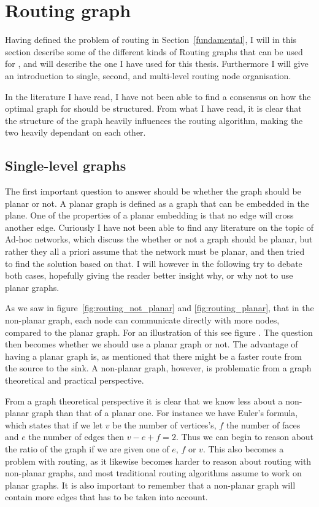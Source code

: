 \section{Routing graph}
Having defined the problem of routing in Section~\ref{fundamental}, I will in this section describe some of the different kinds of Routing graphs that can be used for \manet, and will describe the one I have used for this thesis. Furthermore I will give an introduction to single, second, and multi-level routing node organisation. 

In the literature I have read, I have not been able to find a consensus on how the optimal graph for \manet should be structured. From what I have read, it is clear that the structure of the graph heavily influences the routing algorithm, making the two heavily dependant on each other.

\subsection{Single-level graphs}
\label{single_level}
The first important question to answer should be whether the graph should be planar or not. A planar graph is defined as a graph that can be embedded in the plane. One of the properties of a planar embedding is that no edge will cross another edge.
Curiously I have not been able to find any literature on the topic of Ad-hoc networks, which discuss the whether or not a graph should be planar, but rather they all a priori assume that the network must be planar, and then tried to find the solution based on that. I will however in the following try to debate both cases, hopefully giving the reader better insight why, or why not to use planar graphs.

 As we saw in figure~\ref{fig:routing_not_planar} and \ref{fig:routing_planar}, that in the non-planar graph, each node can communicate directly with more nodes, compared to the planar graph. For an illustration of this see figure . The question then becomes whether we should use a planar graph or not. The advantage of having a planar graph is, as mentioned that there might be a faster route from the source to the sink. A non-planar graph, however, is problematic from a graph theoretical and practical perspective.

From a graph theoretical perspective it is clear that we know less about a non-planar graph than that of a planar one. For instance we have Euler's formula, which states that if we let $v$ be the number of vertices's, $f$ the number of faces and $e$ the number of edges then $v - e + f = 2$. Thus we can begin to reason about the ratio of the graph if we are given one of $e$, $f$ or $v$. This also becomes a problem with routing, as it likewise becomes harder to reason about routing with non-planar graphs, and most traditional routing algorithms assume to work on planar graphs. It is also important to remember that a non-planar graph will contain more edges that has to be taken into account.

